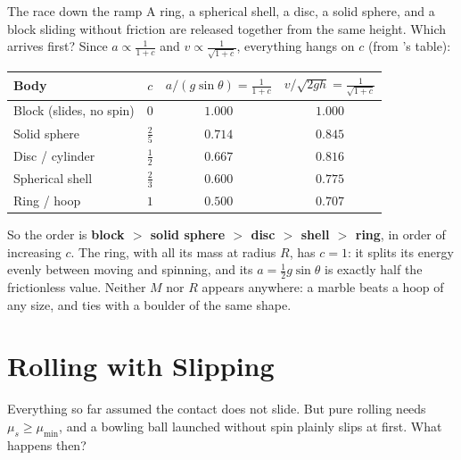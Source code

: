 \begin{exbox}{The race down the ramp}
A ring, a spherical shell, a disc, a solid sphere, and a block sliding without friction are released
together from the same height. Which arrives first? Since $a\propto\tfrac{1}{1+c}$ and
$v\propto\tfrac{1}{\sqrt{1+c}}$, everything hangs on $c$ (from 's table):
\begin{center}
\begin{tabular}{@{}lccc@{}}
\toprule
Body & $c$ & $a/(g\sin\theta)=\tfrac{1}{1+c}$ & $v/\sqrt{2gh}=\tfrac{1}{\sqrt{1+c}}$\\
\midrule
Block (slides, no spin) & $0$ & $1.000$ & $1.000$\\
Solid sphere & $\tfrac25$ & $0.714$ & $0.845$\\
Disc / cylinder & $\tfrac12$ & $0.667$ & $0.816$\\
Spherical shell & $\tfrac23$ & $0.600$ & $0.775$\\
Ring / hoop & $1$ & $0.500$ & $0.707$\\
\bottomrule
\end{tabular}
\end{center}
So the order is \textbf{block $>$ solid sphere $>$ disc $>$ shell $>$ ring}, in order of increasing $c$.
The ring, with all its mass at radius $R$, has $c=1$: it splits its energy evenly between moving and
spinning, and its $a=\tfrac12 g\sin\theta$ is exactly half the frictionless value. Neither $M$ nor $R$
appears anywhere: a marble beats a hoop of any size, and ties with a boulder of the same shape.
\end{exbox}


\section{Rolling with Slipping}\label{sec:slip15}

Everything so far assumed the contact does not slide. But pure rolling needs $\mu_s\ge\mu_{\min}$, and a
bowling ball launched without spin plainly slips at first. What happens then?

